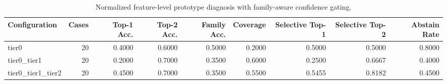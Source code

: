 \begin{table}[t]
\centering
\caption{Normalized feature-level prototype diagnosis with family-aware confidence gating.}
\label{tab:dice_stressor_hierarchical_diagnosis}
\footnotesize
\begin{tabular}{lrrrrrrrr}
\toprule
Configuration & Cases & Top-1 Acc. & Top-2 Acc. & Family Acc. & Coverage & Selective Top-1 & Selective Top-2 & Abstain Rate \\
\midrule
tier0 & 20 & 0.4000 & 0.6000 & 0.5000 & 0.2000 & 0.5000 & 0.5000 & 0.8000 \\
tier0_tier1 & 20 & 0.2000 & 0.7000 & 0.3500 & 0.6000 & 0.2500 & 0.6667 & 0.4000 \\
tier0_tier1_tier2 & 20 & 0.4500 & 0.7000 & 0.3500 & 0.5500 & 0.5455 & 0.8182 & 0.4500 \\
\bottomrule
\end{tabular}

\end{table}
